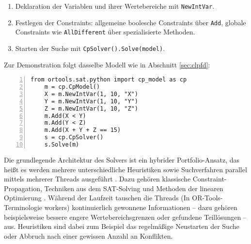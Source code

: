 \documentclass[12pt,a4paper]{article}
\begin{document}
\begin{enumerate}
    \item Deklaration der Variablen und ihrer Wertebereiche mit \texttt{NewIntVar}.
    \item Festlegen der Constraints: allgemeine boolesche Constraints über \texttt{Add}, globale Constraints wie \texttt{AllDifferent} über spezialisierte Methoden.
    \item Starten der Suche mit \texttt{CpSolver().Solve(model)}.
\end{enumerate}

\noindent
Zur Demonstration folgt dasselbe Modell wie in Abschnitt \ref{sec:clpfd}:

\begin{Verbatim}[numbers=left, xleftmargin=5mm, frame=lines]
    from ortools.sat.python import cp_model as cp
    m = cp.CpModel()
    X = m.NewIntVar(1, 10, "X")
    Y = m.NewIntVar(1, 10, "Y")
    Z = m.NewIntVar(1, 10, "Z")
    m.Add(X < Y)
    m.Add(Y < Z)
    m.Add(X + Y + Z == 15)
    s = cp.CpSolver()
    s.Solve(m)
\end{Verbatim}

Die grundlegende Architektur des Solvers ist ein hybrider Portfolio-Ansatz, das heißt es werden mehrere unterschiedliche Heuristiken sowie Suchverfahren parallel mittels mehrerer Threads ausgeführt \cite{perron}.
Dazu gehören klassische Constraint-Propagation, Techniken aus dem SAT-Solving und Methoden der linearen Optimierung \cite{cp-sat-primer}.
Während der Laufzeit tauschen die Threads (In OR-Tools-Terminologie \glqq workers\grqq{}) kontinuierlich gewonnene Informationen -- dazu gehören beispielsweise bessere engere Wertebereichsgrenzen oder gefundene Teillösungen -- aus.
Heuristiken sind dabei zum Beispiel das regelmäßige Neustarten der Suche oder Abbruch nach einer gewissen Anzahl an Konflikten.
\end{document}
